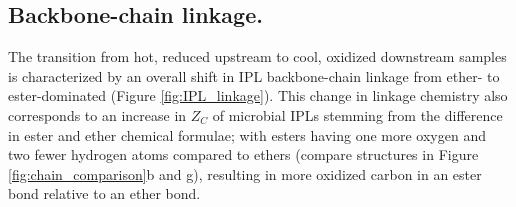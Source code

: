 

\subsection{Backbone-chain linkage.} The transition from hot, reduced upstream to cool, oxidized downstream samples is characterized by an overall shift in IPL backbone-chain linkage from ether- to ester-dominated (Figure \ref{fig:IPL_linkage}). This change in linkage chemistry also corresponds to an increase in $Z_{C}$ of microbial IPLs stemming from the difference in ester and ether chemical formulae; with esters having one more oxygen and two fewer hydrogen atoms compared to ethers (compare structures in Figure \ref{fig:chain_comparison}b and g), resulting in more oxidized carbon in an ester bond relative to an ether bond.




